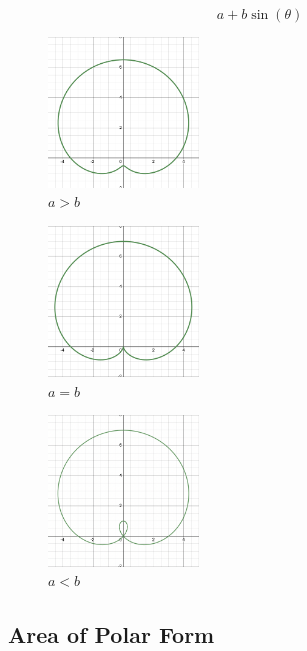     \begin{equation}
        a+b\sin{(\theta)}
    \end{equation}
    \begin{multicols}{3}
    \begin{figure}[H]
        \centering
        \includegraphics[width=4cm]{Pictures/Polar Form/SinBiggerReflect.png}
        \caption[]{$a>b$ \footnotemark[2]}
        \label{a>b}
    \end{figure}
    \begin{figure}[H]
        \centering
        \includegraphics[width=4cm]{Pictures/Polar Form/SinEqualReflect.png}
        \caption[]{$a=b$ \footnotemark[2]}
        \label{a=b}
    \end{figure}
    \begin{figure}[H]
        \centering
        \includegraphics[width=4cm]{Pictures/Polar Form/SinSmallerReflect.png}
        \caption[]{$a<b$ \footnotemark[2]}
        \label{a<b}
    \end{figure}
    \end{multicols}

\subsection{Area of Polar Form}

